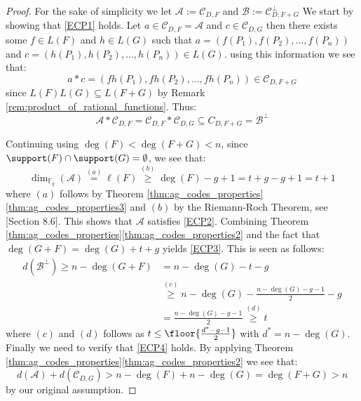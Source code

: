 \begin{proof}
  For the sake of simplicity we let $\mathcal{A} := \mathcal{C}_{D, F}$ and $\mathcal{B} := \mathcal{C}_{D, F + G}^{\perp}$
  We start by showing that \ref{ECP1} holds. Let $a \in \mathcal{C}_{D, F} = \mathcal{A}$ and $c  \in \mathcal{C}_{D, G}$ then there exists some $f \in L(F)$ and $h \in L(G)$ such that $a =(f(P_{1}), f(P_2), \ldots, f(P_{n}))$ and $c = (h(P_{1}), h(P_2), \ldots, h(P_{n})) \in L(G)$.
  using this information we see that:
  \begin{equation*}
    a * c = (fh(P_1), fh(P_2), \ldots, fh(P_{n})) \in \mathcal{C}_{D, F + G}
  \end{equation*}
  since $L(F)L(G) \subseteq L(F + G)$ by Remark \ref{rem:product_of_rational_functions}. Thus:
  \begin{equation*}
  \mathcal{A} * \mathcal{C}_{D, F} = \mathcal{C}_{D, F} * \mathcal{C}_{D, G} \subseteq C_{D, F + G} = \mathcal{B}^{\perp}
  \end{equation*}

  Continuing using $\deg(F) < \deg(F + G) < n$, since $\support(F) \cap \support(G) = \emptyset$, we see that:
  \begin{equation*}
    \dim_{\mathbb{F}_q}(\mathcal{A}) \stackrel{(a)}{=} \ell(F) \stackrel{(b)}{\geq} \deg(F) - g + 1 = t + g - g + 1 = t + 1
  \end{equation*}
  where $(a)$ follows by Theorem \ref{thm:ag_codes_properties}\ref{thm:ag_codes_properties3} and $(b)$ by the Riemann-Roch Theorem, see \cite{Fulton}[Section 8.6]. This shows that $\mathcal{A}$ satisfies \ref{ECP2}. Combining Theorem \ref{thm:ag_codes_properties}\ref{thm:ag_codes_properties2} and the fact that $\deg(G + F) = \deg(G) + t + g$ yields  \ref{ECP3}. This is seen as follows:
  \begin{align*}
    d(\mathcal{B}^{\perp}) \geq n - \deg(G + F) &= n - \deg(G) - t - g\\ &\stackrel{(c)}\geq n - \deg(G) - \frac{n - \deg(G) - g - 1}{2} - g \\ &= \frac{n - \deg(G) - g - 1}{2} \stackrel{(d)}{\geq} t
  \end{align*}
  where $(c)$ and $(d)$ follows as $t \leq \floor{\frac{d^{*} - g - 1}{2}}$ with $d^{*} = n - \deg(G)$. Finally we need to verify that \ref{ECP4} holds. By applying Theorem \ref{thm:ag_codes_properties}\ref{thm:ag_codes_properties2} we see that:
  \begin{equation*}
    d(\mathcal{A}) + d(\mathcal{C}_{D, G}) > n - \deg(F) + n - \deg(G) = \deg(F + G) > n
  \end{equation*}
  by our original assumption.
\end{proof}
